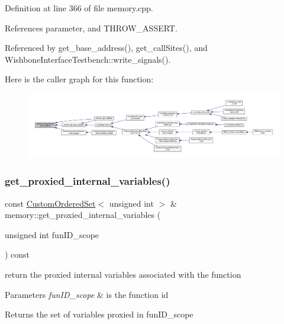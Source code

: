 Definition at line 366 of file memory.\+cpp.



References parameter, and T\+H\+R\+O\+W\+\_\+\+A\+S\+S\+E\+RT.



Referenced by get\+\_\+base\+\_\+address(), get\+\_\+call\+Sites(), and Wishbone\+Interface\+Testbench\+::write\+\_\+signals().

Here is the caller graph for this function\+:
\nopagebreak
\begin{figure}[H]
\begin{center}
\leavevmode
\includegraphics[width=350pt]{d8/d99/classmemory_a6488e1ee13bcf993f0406c377b4f42e4_icgraph}
\end{center}
\end{figure}
\mbox{\label{classmemory_afa287c1bff2634613e59d7ece4d74d60}} 
\subsubsection{\texorpdfstring{get\+\_\+proxied\+\_\+internal\+\_\+variables()}{get\_proxied\_internal\_variables()}}
{\footnotesize\ttfamily const \hyperlink{classCustomOrderedSet}{Custom\+Ordered\+Set}$<$ unsigned int $>$ \& memory\+::get\+\_\+proxied\+\_\+internal\+\_\+variables (\begin{DoxyParamCaption}\item[{unsigned int}]{fun\+I\+D\+\_\+scope }\end{DoxyParamCaption}) const}



return the proxied internal variables associated with the function 


\begin{DoxyParams}{Parameters}
{\em fun\+I\+D\+\_\+scope} & is the function id \\
\hline
\end{DoxyParams}
\begin{DoxyReturn}{Returns}
the set of variables proxied in fun\+I\+D\+\_\+scope 
\end{DoxyReturn}


